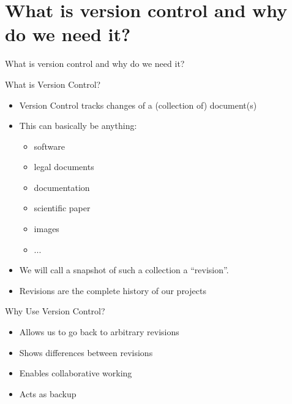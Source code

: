 \section[Version Control]{What is version control and why do we need it?}

\begin{frame}[c]%
  \begin{center}%
    \Huge\color{vertexDarkRed}What is version control and why do we need it?%
  \end{center}%
\end{frame}%


\begin{frame}[c]{What is Version Control?}
  \begin{itemize}
    \item Version Control tracks changes of a (collection of) document(s)
    \item This can basically be anything:
      \begin{itemize}
        \item software
        \item legal documents
        \item documentation
        \item scientific paper
        \item images
        \item ...
      \end{itemize}
    \item We will call a snapshot of such a collection a \enquote{revision}.
    \item Revisions are the complete history of our projects
  \end{itemize}
\end{frame}

\begin{frame}[c]{Why Use Version Control?}
  \begin{itemize}
    \item Allows us to go back to arbitrary revisions
    \item Shows differences between revisions
    \item Enables collaborative working
    \item Acts as backup
  \end{itemize}
\end{frame}

